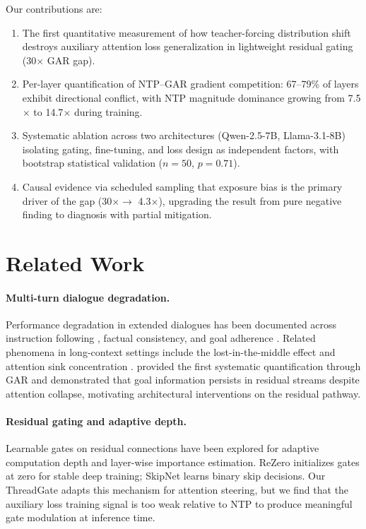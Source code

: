 \documentclass[11pt]{article}
\begin{document}
Our contributions are:
\begin{enumerate}
    \item The first quantitative measurement of how teacher-forcing distribution shift destroys auxiliary attention loss generalization in lightweight residual gating (30$\times$ GAR gap).
    \item Per-layer quantification of NTP--GAR gradient competition: 67--79\% of layers exhibit directional conflict, with NTP magnitude dominance growing from 7.5$\times$ to 14.7$\times$ during training.
    \item Systematic ablation across two architectures (Qwen-2.5-7B, Llama-3.1-8B) isolating gating, fine-tuning, and loss design as independent factors, with bootstrap statistical validation ($n=50$, $p=0.71$).
    \item Causal evidence via scheduled sampling that exposure bias is the primary driver of the gap (30$\times \to$ 4.3$\times$), upgrading the result from pure negative finding to diagnosis with partial mitigation.
\end{enumerate}

\section{Related Work}

\paragraph{Multi-turn dialogue degradation.}
Performance degradation in extended dialogues has been documented across instruction following \citep{zheng2024judging}, factual consistency, and goal adherence \citep{dongre2026}. Related phenomena in long-context settings include the lost-in-the-middle effect \citep{liu2024lost} and attention sink concentration \citep{xiao2024efficient}. \citet{dongre2026} provided the first systematic quantification through GAR and demonstrated that goal information persists in residual streams despite attention collapse, motivating architectural interventions on the residual pathway.

\paragraph{Residual gating and adaptive depth.}
Learnable gates on residual connections have been explored for adaptive computation depth \citep{bachlechner2021rezero, veit2016residual} and layer-wise importance estimation. ReZero \citep{bachlechner2021rezero} initializes gates at zero for stable deep training; SkipNet \citep{wang2018skipnet} learns binary skip decisions. Our ThreadGate adapts this mechanism for attention steering, but we find that the auxiliary loss training signal is too weak relative to NTP to produce meaningful gate modulation at inference time.
\end{document}
